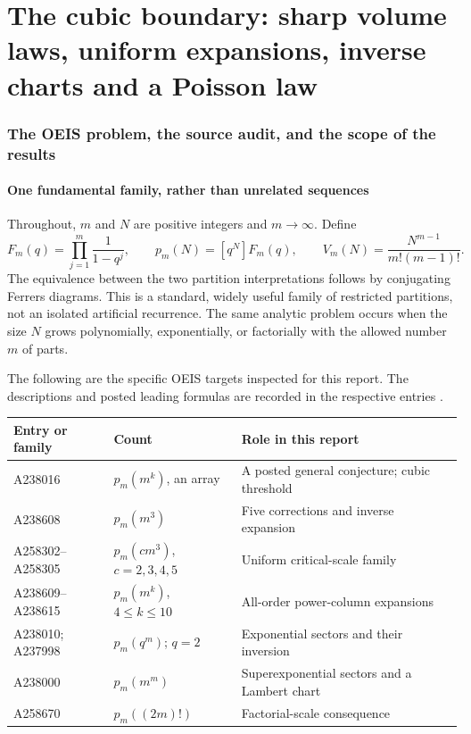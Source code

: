 \documentclass[11pt]{article}
\theoremstyle{definition}
\theoremstyle{remark}
\numberwithin{equation}{section}
\begin{document}
\clearpage
\begingroup
\setlength{\parskip}{0pt}
\tableofcontents
\endgroup
\clearpage

\part{The cubic boundary: sharp volume laws, uniform expansions, inverse charts and a Poisson law}

\section{The OEIS problem, the source audit, and the scope of the results}\label{rpc:sec:intro}

\subsection{One fundamental family, rather than unrelated sequences}

Throughout, $m$ and $N$ are positive integers and $m\to\infty$. Define
\begin{equation}\label{rpc:eq:gf}
 F_m(q)=\prod_{j=1}^m\frac1{1-q^j},\qquad
 p_m(N)=[q^N]F_m(q),\qquad
 V_m(N)=\frac{N^{m-1}}{m!(m-1)!}.
\end{equation}
The equivalence between the two partition interpretations follows by
conjugating Ferrers diagrams. This is a standard, widely useful family of
restricted partitions, not an isolated artificial recurrence. The same
analytic problem occurs when the size $N$ grows polynomially, exponentially,
or factorially with the allowed number $m$ of parts.

The following are the specific OEIS targets inspected for this report.
The descriptions and posted leading formulas are recorded in the respective
entries \cite{oeis238016,oeis238608,oeis238010,oeis258670}.
\begin{center}
\small
\begin{tabular}{@{}p{}p{}p{}@{}}
\toprule
Entry or family & Count & Role in this report\\
\midrule
A238016 & $p_m(m^k)$, an array & A posted general conjecture; cubic threshold\\
A238608 & $p_m(m^3)$ & Five corrections and inverse expansion\\
A258302--A258305 & $p_m(c m^3)$, $c=2,3,4,5$ & Uniform critical-scale family\\
A238609--A238615 & $p_m(m^k)$, $4\le k\le10$ & All-order power-column expansions\\
A238010; A237998 & $p_m(q^m)$; $q=2$ & Exponential sectors and their inversion\\
A238000 & $p_m(m^m)$ & Superexponential sectors and a Lambert chart\\
A258670 & $p_m((2m)!)$ & Factorial-scale consequence\\
\bottomrule
\end{tabular}
\end{center}
\end{document}
